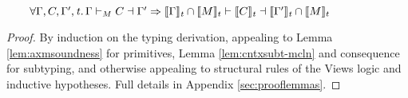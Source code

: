 \begin{lemma}
  \label{lemma:embedw}
\\\mbox{$\qquad
\forall\Gamma,C,\Gamma',\mathit{t}\ldotp\Gamma\vdash_M C\dashv \Gamma' \Rightarrow
\llbracket\Gamma\rrbracket_\mathit{t}\cap\llbracket{M}\rrbracket_t\vdash \llbracket C\rrbracket_\mathit{t}\dashv\llbracket\Gamma'\rrbracket_\mathit{t}\cap\llbracket{M}\rrbracket_t
$}
\end{lemma}
\begin{proof}
By induction on the typing derivation, appealing to Lemma \ref{lem:axmsoundness} for primitives, Lemma \ref{lem:cntxsubt-mcln} and consequence for subtyping, and otherwise appealing to structural rules of the Views logic and inductive hypotheses.
Full details in Appendix \ref{sec:prooflemmas}. %
  \end{proof}

